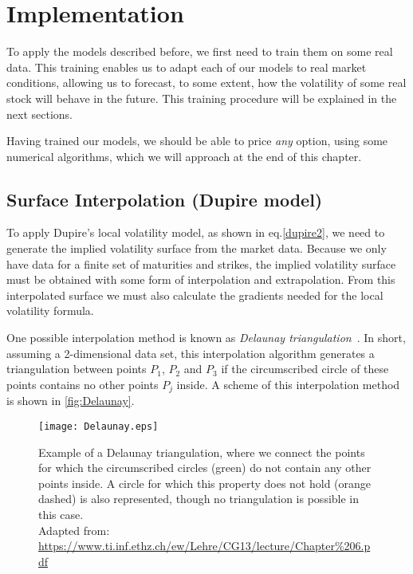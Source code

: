 \chapter{Implementation}
\label{chapter:implementation}
To apply the models described before, we first need to train them on some real data.
This training enables us to adapt each of our models to real market conditions, allowing us to forecast, to some extent, how the volatility of some real stock will behave in the future. This training procedure will be explained in the next sections.

Having trained our models, we should be able to price \emph{any} option, using some numerical algorithms, which we will approach at the end of this chapter.

\section{Surface Interpolation (Dupire model)}
\label{section:Surface Interpolation (Dupire)}
To apply Dupire's local volatility model, as shown in eq.\eqref{dupire2}, we need to generate the implied volatility surface from the market data. Because we only have data for a finite set of maturities and strikes, the implied volatility surface must be obtained with some form of interpolation and extrapolation. From this interpolated surface we must also calculate the gradients needed for the local volatility formula.

 
One possible interpolation method is known as \emph{Delaunay triangulation}~\citep{Isaac}. In short, assuming a 2-dimensional data set, this interpolation algorithm generates a triangulation between points $P_1$, $P_2$ and $P_3$ if the circumscribed circle of these points contains no other points $P_j$ inside. A scheme of this interpolation method is shown in \autoref{fig:Delaunay}.

\begin{figure}[!htb]
    \centering
      \texttt{[image: Delaunay.eps]}
      \caption[Example of a Delaunay triangulation, where we connect the points for which the circumscribed circles do not contain any other points inside. A circle for which this property does not hold is also represented, though no triangulation is possible in this case.]{Example of a Delaunay triangulation, where we connect the points for which the circumscribed circles (green) do not contain any other points inside. A circle for which this property does not hold (orange dashed) is also represented, though no triangulation is possible in this case.\\{\small Adapted from: \url{https://www.ti.inf.ethz.ch/ew/Lehre/CG13/lecture/Chapter\%206.pdf}}}\label{fig:Delaunay}
    \end{figure}


